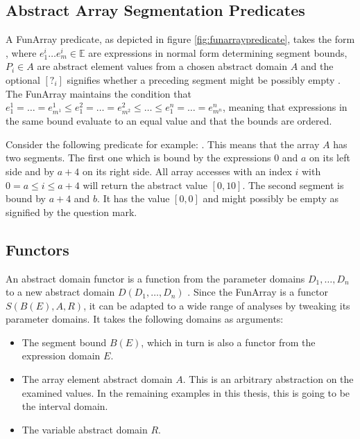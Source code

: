 \subsection{Abstract Array Segmentation Predicates}

A FunArray predicate, as depicted in figure \ref{fig:funarraypredicate}, takes the form , where $e^i_1\ldots e^i_m\in\mathbb{E}$ are expressions in normal form determining segment bounds, $P_i\in A$ are abstract element values from a chosen abstract domain $A$ and the optional $[?_i]$ signifies whether a preceding segment might be possibly empty \cite{cousot2011}. The FunArray maintains the condition that $e_1^1=\ldots=e_{m^1}^1\leq e_1^2=\ldots=e_{m^2}^2\leq\ldots\leq e_1^n=\ldots=e_{m^n}^n$, meaning that expressions in the same bound evaluate to an equal value and that the bounds are ordered. 


\noindent Consider the following predicate for example: . This means that the array $A$ has two segments. The first one which is bound by the expressions $0$ and $a$ on its left side and by $a+4$ on its right side. All array accesses with an index $i$ with $0=a\leq i \leq a+ 4$ will return the abstract value $[0,10]$. The second segment is bound by $a+4$ and $b$. It has the value $[0,0]$ and might possibly be empty as signified by the question mark.


\subsection{Functors}

An abstract domain functor is a function from the parameter domains $D_1,\ldots,D_n$ to a new abstract domain $D(D_1,\ldots,D_n)$ \cite{cousot2011}.
Since the FunArray is a functor $S(B(E),A,R)$, it can be adapted to a wide range of analyses by tweaking its parameter domains. It takes the following domains as arguments:
\begin{itemize}[label={--}]
	\item The segment bound $B(E)$, which in turn is also a functor from the expression domain $E$.
	\item The array element abstract domain $A$. This is an arbitrary abstraction on the examined values. In the remaining examples in this thesis, this is going to be the interval domain.
	\item The variable abstract domain $R$.
\end{itemize} 

